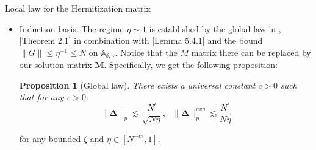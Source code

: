 \documentclass[11pt, a4paper, oneside]{book}
\numberwithin{equation}{chapter}
\newcommand{\beq}{\begin{equation}}
\newcommand{\eeq}{\end{equation}}
\newtheorem{prop}[thm]{Proposition}
\begin{document}
\begin{section}{Local law for the Hermitization matrix}
\begin{itemize}
    $\|D\|_p \ll 1$ because then $\|\mathbf{G}\|_p \leq \|\mathbf{M}\|_p + \|\mathbf{\Delta}\|_p \lesssim 1 ,$ for all $p \in \mathbb{N}$ and $N\eta \gg 1.$ This in turn, through \eqref{Delta-ineq}, implies that $\|\Delta\|_p \ll 1.$ Finally we estimate that $\|\mathbf{\Delta}\|_p \ll 1$ because of \eqref{Delta-Delta}. Altogether, this argument shows that $\|\mathbf{\Delta}\|_p \lesssim 1$ implies $\|\mathbf{\Delta}\|_p \ll 1$ on all of $\mathbb{A}_{\delta,\gamma},$ for any $\gamma>0$, where we introduced the parameter set:
    $$(\zeta,\eta) \in \mathbb{A}_{\delta,\gamma}:= S_{\tau,\delta, \kappa} \times [N^{-1+\gamma},1].$$
    This implication is bootstrapped from $\eta \sim 1$ all the way to $\eta \sim N^{-1+\gamma},$ and is formulated in the following bootstrapping lemma \ref{Boot} which we import from \cite{alt2022local}. Its proof in our model is similar.

    \item \underline{Induction basis.} The regime $\eta \sim 1$ is established by the global law in \cite{erdHos2019random}, [Theorem 2.1] in combination with [Lemma 5.4.1] and the bound $\|G\| \leq \eta^{-1} \leq N $ on $\mathbb{A}_{\delta,\gamma}.$ Notice that the $M$ matrix there can be replaced by our solution matrix $\mathbf{M}$. Specifically, we get the following proposition:
    \begin{prop}[Global law] \label{global} There exists a universal constant $c>0$ such that for any $\epsilon>0:$
    \beq
    \|\mathbf{\Delta}\|_p \lesssim \frac{N^{\epsilon}}{\sqrt{N\eta}}, \ \ \  \|\mathbf{\Delta}\|_p^{avg} \lesssim \frac{N^{\epsilon}}{N\eta}
    \eeq
    \end{prop}
    for any bounded $\zeta$ and $\eta \in [N^{-c\epsilon},1].$
\end{itemize}
%
%
\end{section}
\end{document}

